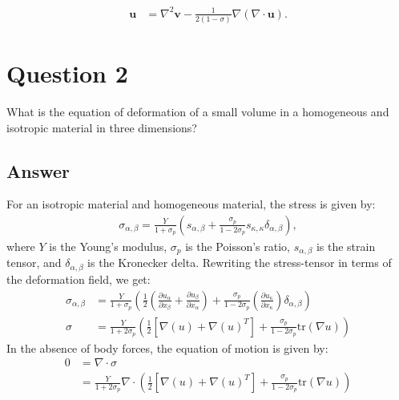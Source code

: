 \documentclass{article}
\newcommand{\laplace}{\nabla^2}
\begin{document}
\begin{align*}
    \mathbf{u} &= \laplace\mathbf{v} - \frac{1}{2(1-\sigma)}\nabla\left(\nabla\cdot\mathbf{u}\right).
\end{align*}

\section*{Question 2}
What is the equation of deformation of a small volume in a homogeneous and isotropic material in three dimensions?

\subsection*{Answer}
For an isotropic material and homogeneous material, the stress is given by:
\begin{align*}
    \sigma_{\alpha,\beta} = \frac{Y}{1+\sigma_p}\left(s_{\alpha,\beta} + \frac{\sigma_p}{1-2\sigma_p}s_{\kappa, \kappa}\delta_{\alpha,\beta}\right),
\end{align*}where $Y$ is the Young's modulus, $\sigma_p$ is the Poisson's ratio, $s_{\alpha,\beta}$ is the strain tensor, and $\delta_{\alpha,\beta}$ is the Kronecker delta.
Rewriting the stress-tensor in terms of the deformation field, we get:
\begin{align*}
    \sigma_{\alpha,\beta} &= \frac{Y}{1+\sigma_p}\left(\frac{1}{2}\left(\frac{\partial u_\alpha}{\partial x_\beta} + \frac{\partial u_\beta}{\partial x_\alpha}\right) + \frac{\sigma_p}{1-2\sigma_p}\left(\frac{\partial u_\kappa}{\partial x_\kappa}\right)\delta_{\alpha,\beta}\right)\\
    \sigma &= \frac{Y}{1 + 2\sigma_p}\left(\frac{1}{2}\left[\nabla(u) + \nabla(u)^T\right] + \frac{\sigma_p}{1-2\sigma_p}\text{tr}(\nabla u)\right)
\end{align*} In the absence of body forces, the equation of motion is given by:
\begin{align*}
    0 &= \nabla\cdot \sigma\\
    &= \frac{Y}{1 + 2\sigma_p}\nabla\cdot\left(\frac{1}{2}\left[\nabla(u) + \nabla(u)^T\right] + \frac{\sigma_p}{1-2\sigma_p}\text{tr}(\nabla u)\right)
\end{align*}
\end{document}

